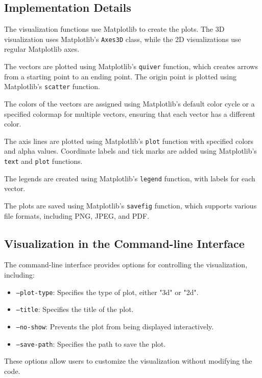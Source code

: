 \subsection{Implementation Details}

The visualization functions use Matplotlib to create the plots. The 3D visualization uses Matplotlib's \texttt{Axes3D} class, while the 2D visualizations use regular Matplotlib axes.

The vectors are plotted using Matplotlib's \texttt{quiver} function, which creates arrows from a starting point to an ending point. The origin point is plotted using Matplotlib's \texttt{scatter} function.

The colors of the vectors are assigned using Matplotlib's default color cycle or a specified colormap for multiple vectors, ensuring that each vector has a different color.

The axis lines are plotted using Matplotlib's \texttt{plot} function with specified colors and alpha values. Coordinate labels and tick marks are added using Matplotlib's \texttt{text} and \texttt{plot} functions.

The legends are created using Matplotlib's \texttt{legend} function, with labels for each vector.

The plots are saved using Matplotlib's \texttt{savefig} function, which supports various file formats, including PNG, JPEG, and PDF.

\subsection{Visualization in the Command-line Interface}

The command-line interface provides options for controlling the visualization, including:

\begin{itemize}
    \item \texttt{--plot-type}: Specifies the type of plot, either "3d" or "2d".
    \item \texttt{--title}: Specifies the title of the plot.
    \item \texttt{--no-show}: Prevents the plot from being displayed interactively.
    \item \texttt{--save-path}: Specifies the path to save the plot.
\end{itemize}

These options allow users to customize the visualization without modifying the code.
